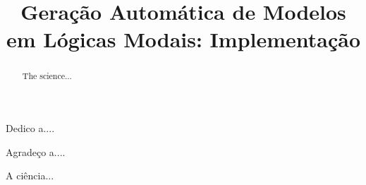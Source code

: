 \documentclass[bacharelado]{unb-cic}
\title{Geração Automática de Modelos em Lógicas Modais: Implementação}
\begin{document}
  \maketitle
  \pretextual

  \begin{dedicatoria}
  Dedico a....
  \end{dedicatoria}

  \begin{agradecimentos}
  Agradeço a....
  \end{agradecimentos}

  \begin{resumo}
  A ciência...
  \end{resumo}

  \begin{abstract}
  The science...
  \end{abstract}

  \tableofcontents
  \listoffigures
  \listoftables

  \textual
  
  
  
  

  \postextual
  
  
\end{document}
